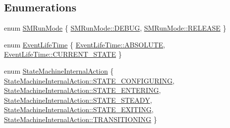 \subsection*{Enumerations}
\begin{DoxyCompactItemize}
\item 
enum \hyperlink{namespacesmacc_a3e4f79486ea6ea6342dd3c712d16a4f6}{S\+M\+Run\+Mode} \{ \hyperlink{namespacesmacc_a3e4f79486ea6ea6342dd3c712d16a4f6adc30ec20708ef7b0f641ef78b7880a15}{S\+M\+Run\+Mode\+::\+D\+E\+B\+UG}, 
\hyperlink{namespacesmacc_a3e4f79486ea6ea6342dd3c712d16a4f6a7d649ef069df9885e382417c79f3d5cd}{S\+M\+Run\+Mode\+::\+R\+E\+L\+E\+A\+SE}
 \}
\item 
enum \hyperlink{namespacesmacc_a5063f47926ad2fe25120ed4b1e7b2c7e}{Event\+Life\+Time} \{ \hyperlink{namespacesmacc_a5063f47926ad2fe25120ed4b1e7b2c7ea3a0bc063b6db8cae0361657958be836f}{Event\+Life\+Time\+::\+A\+B\+S\+O\+L\+U\+TE}, 
\hyperlink{namespacesmacc_a5063f47926ad2fe25120ed4b1e7b2c7ea49b599d413671f16f08d0dd18243c294}{Event\+Life\+Time\+::\+C\+U\+R\+R\+E\+N\+T\+\_\+\+S\+T\+A\+TE}
 \}
\item 
enum \hyperlink{namespacesmacc_a0889aff43c93fe5285109819d2898144}{State\+Machine\+Internal\+Action} \{ \newline
\hyperlink{namespacesmacc_a0889aff43c93fe5285109819d2898144a32406d3560b9f36b3e6e3b84454e1be5}{State\+Machine\+Internal\+Action\+::\+S\+T\+A\+T\+E\+\_\+\+C\+O\+N\+F\+I\+G\+U\+R\+I\+NG}, 
\hyperlink{namespacesmacc_a0889aff43c93fe5285109819d2898144aef27ae3e54b805b81e1efacea3c02575}{State\+Machine\+Internal\+Action\+::\+S\+T\+A\+T\+E\+\_\+\+E\+N\+T\+E\+R\+I\+NG}, 
\hyperlink{namespacesmacc_a0889aff43c93fe5285109819d2898144aaefffb251a9a48e0e3274e9475d22749}{State\+Machine\+Internal\+Action\+::\+S\+T\+A\+T\+E\+\_\+\+S\+T\+E\+A\+DY}, 
\hyperlink{namespacesmacc_a0889aff43c93fe5285109819d2898144a22bd5bb7935dd66f181d92efc273951e}{State\+Machine\+Internal\+Action\+::\+S\+T\+A\+T\+E\+\_\+\+E\+X\+I\+T\+I\+NG}, 
\newline
\hyperlink{namespacesmacc_a0889aff43c93fe5285109819d2898144a5e174e130ee1847f37541ba5786207a3}{State\+Machine\+Internal\+Action\+::\+T\+R\+A\+N\+S\+I\+T\+I\+O\+N\+I\+NG}
 \}
\end{DoxyCompactItemize}
